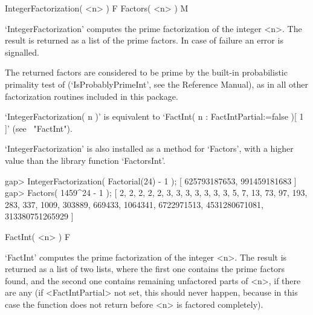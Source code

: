 



\>IntegerFactorization( <n> ) F
\>Factors( <n> ) M

`IntegerFactorization' computes the prime factorization of the
integer <n>. The result is returned as a list of the prime factors.
In case of failure an error is signalled.

The returned factors are considered to be prime by the built-in
probabilistic primality test of {\GAP} 
(`IsProbablyPrimeInt', see the Reference Manual),
as in all other factorization routines included in this package.

`IntegerFactorization( n )' is equivalent to
`FactInt( n : FactIntPartial:=false )[ 1 ]'
(see ~"FactInt").

`IntegerFactorization' is also installed as a method for `Factors',
with a higher value than the {\GAP} library function `FactorsInt'.

\beginexample
gap> IntegerFactorization( Factorial(24) - 1 );
[ 625793187653, 991459181683 ]
\endexample
\beginexample
gap> Factors( 1459^24 - 1 );
[ 2, 2, 2, 2, 2, 3, 3, 3, 3, 3, 3, 3, 5, 7, 13, 73, 97, 193, 283, 337, 1009, 
  303889, 669433, 1064341, 6722971513, 4531280671081, 313380751265929 ]
\endexample



\>FactInt( <n> ) F

`FactInt' computes the prime factorization of the integer <n>.
The result is returned as a list of two lists, where the first one 
contains the prime factors found, and the second one contains
remaining 
unfactored parts of <n>,
if there are any (if <FactIntPartial> not set,
this should never happen, because in this case the
function does not return before <n> is factored completely).

